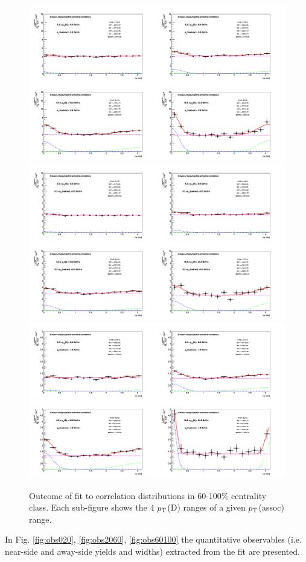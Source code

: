 \begin{figure}
\centering
{\includegraphics[width=0.8\linewidth]{figuresVsCent/Averages/60100/cFitting_0_pthad03to99.png}}
{\includegraphics[width=0.8\linewidth]{figuresVsCent/Averages/60100/cFitting_0_pthad03to1.png}}
{\includegraphics[width=0.8\linewidth]{figuresVsCent/Averages/60100/cFitting_0_pthad1to99.png}}
 \caption{Outcome of fit to correlation distributions in 60-100\% centrality class. Each sub-figure shows the 4 $p_{\rm T}$(D) ranges of a given $p_{\rm T}$(assoc) range.}
\label{fig:fit60100}
\end{figure}

\clearpage
In Fig. \ref{fig:obs020}, \ref{fig:obs2060}, \ref{fig:obs60100} the quantitative observables (i.e. near-side and away-side yields and widths) extracted from the fit are presented.

